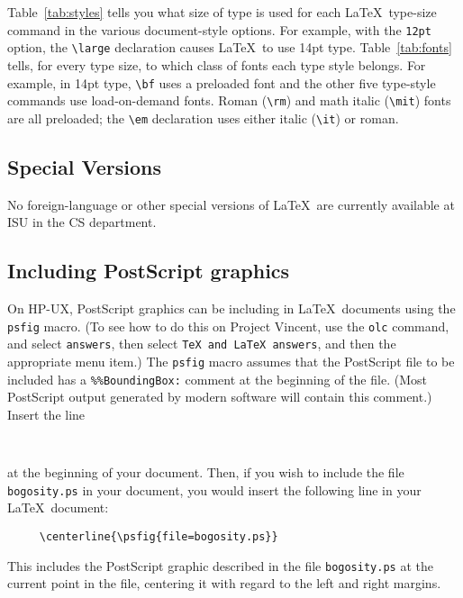 Table~\ref{tab:styles} tells you what size of type is used for each
\LaTeX\ type-size command in the various document-style options.  For
example, with the {\tt 12pt} option, the \hbox{\verb|\large|}
declaration causes \LaTeX\ to use 14pt type.  Table~\ref{tab:fonts}
tells, for every type size, to which class of fonts each type style
belongs.  For example, in 14pt type, \verb|\bf| uses a preloaded
font and the other five type-style commands use load-on-demand fonts.
Roman (\verb|\rm|) and math italic (\verb|\mit|) fonts are all
preloaded; the \hbox{\verb|\em|} declaration uses either italic
(\verb|\it|) or roman.



  
\subsection{Special Versions}

No foreign-language or other special versions of \LaTeX\
are currently available at ISU in the CS department.


\subsection{Including PostScript graphics}

On HP-UX,
PostScript graphics can be including in \LaTeX\ documents using the 
{\tt psfig} macro.
(To see how to do this on Project Vincent, use the {\tt olc}
command, and select {\tt answers}, then select {\tt TeX and LaTeX answers},
and then the appropriate menu item.)
The {\tt psfig} macro assumes that the PostScript file to be included has a
\verb|%%BoundingBox:| comment at the beginning of the file.
(Most PostScript output generated by modern software will contain this 
comment.)
Insert the line
\begin{verbatim}
     
\end{verbatim}
at the beginning of your document.
Then, if you wish to include the file {\tt bogosity.ps}
in your document, you would
insert the following line in your \LaTeX\ document:
\begin{verbatim}
     \centerline{\psfig{file=bogosity.ps}}
\end{verbatim}
This includes the PostScript graphic described in the file
{\tt bogosity.ps} at the current point in the file, centering
it with regard to the left and right margins.

